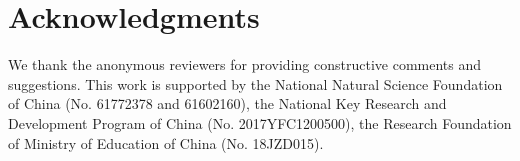 \documentclass[letterpaper]{article} %
\begin{document}
\newpage




\section*{Acknowledgments}

We thank the anonymous reviewers for providing constructive comments and suggestions.
This work is supported by the National Natural Science Foundation of China (No. 61772378 and 61602160), 
the National Key Research and Development Program of China (No. 2017YFC1200500), 
the Research Foundation of Ministry of Education of China (No. 18JZD015).







\end{document}
